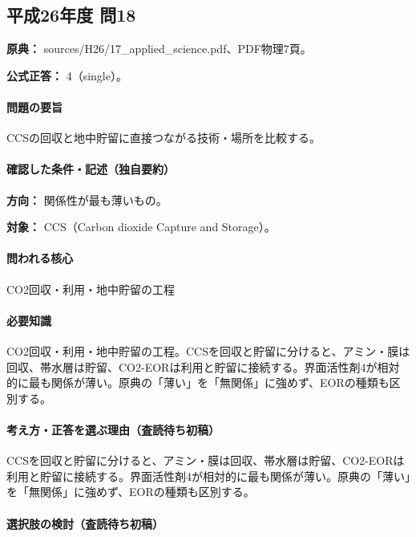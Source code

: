 \subsection{平成26年度 問18}
\label{q:h26-reg-applied-18}

\noindent\textbf{原典：} sources/H26/17\_applied\_science.pdf、PDF物理7頁。

\textbf{公式正答：} 4（single）。

\paragraph{問題の要旨} CCSの回収と地中貯留に直接つながる技術・場所を比較する。

\paragraph{確認した条件・記述（独自要約）}\mbox{}\par

\noindent\textbf{方向：} 関係性が最も薄いもの。\par

\noindent\textbf{対象：} CCS（Carbon dioxide Capture and Storage）。\par

\paragraph{問われる核心} CO2回収・利用・地中貯留の工程

\paragraph{必要知識} CO2回収・利用・地中貯留の工程。CCSを回収と貯留に分けると、アミン・膜は回収、帯水層は貯留、CO2-EORは利用と貯留に接続する。界面活性剤4が相対的に最も関係が薄い。原典の「薄い」を「無関係」に強めず、EORの種類も区別する。

\paragraph{考え方・正答を選ぶ理由（査読待ち初稿）} CCSを回収と貯留に分けると、アミン・膜は回収、帯水層は貯留、CO2-EORは利用と貯留に接続する。界面活性剤4が相対的に最も関係が薄い。原典の「薄い」を「無関係」に強めず、EORの種類も区別する。

\paragraph{選択肢の検討（査読待ち初稿）}\mbox{}\par

